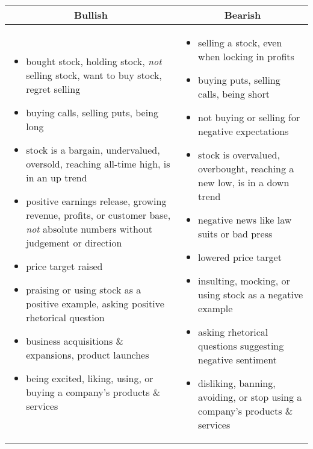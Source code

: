 \begin{table}[!ht]
\centering
\small
\begin{tabular}{p{7.5cm}p{7.5cm}}
\toprule
\multicolumn{1}{c}{\textbf{Bullish}} & \multicolumn{1}{c}{\textbf{Bearish}} \\
\midrule

\begin{itemize}[noitemsep,leftmargin=*,topsep=-12pt]
	\item bought stock, holding stock, \emph{not} selling stock, want to buy stock, regret selling
	\item buying calls, selling puts, being long
	\item stock is a bargain, undervalued, oversold, reaching all-time high, is in an up trend
	\item positive earnings release, growing revenue, profits, or customer base, \emph{not} absolute numbers without judgement or direction
	\item price target raised
	\item praising or using stock as a positive example, asking positive rhetorical question
	\item business acquisitions \& expansions, product launches
	\item being excited, liking, using, or buying a company's products \& services

\end{itemize} & \begin{itemize}[noitemsep,leftmargin=*,topsep=-12pt]
	\item selling a stock, even when locking in profits
	\item buying puts, selling calls, being short
	\item not buying or selling for negative expectations
 	\item stock is overvalued, overbought, reaching a new low, is in a down trend
 	\item negative news like law suits or bad press
 	\item lowered price target
 	\item insulting, mocking, or using stock as a negative example
 	\item asking rhetorical questions suggesting negative sentiment 
	\item disliking, banning, avoiding, or stop using a company's products \& services
\end{itemize}\\


\end{tabular}
\end{table}
